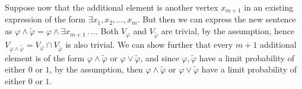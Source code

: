 \documentclass{article}
\begin{document}
Suppose now that the additional element is another vertex $x_{m+1}$ in an existing expression of the form $\exists{x_1,x_2,\dots,x_m}$. But then we can express the new sentence as $\varphi\land\tilde\varphi=\varphi\land\exists{x_{m+1}}\,.\,\dots$
Both $V_\varphi$ and $V_{\tilde\varphi}$ are trivial, by the assumption, hence $V_{\varphi\land\tilde\varphi}=V_\varphi\cap{V_{\tilde\varphi}}$ is also trivial.
We can show further that every $m+1$ additional element is of the form $\varphi\land\tilde\varphi$ or $\varphi\lor\tilde\varphi$, and since $\varphi,\tilde\varphi$ have a limit probability of either $0$ or $1$, by the assumption, then $\varphi\land\tilde\varphi$ or $\varphi\lor\tilde\varphi$ have a limit probability of either $0$ or $1$.
\end{document}
